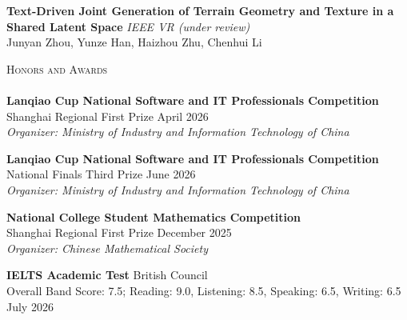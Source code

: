 \documentclass[a4paper, 11pt]{article}
\newcommand{\lineunder} {
    \vspace*{-8pt} \\
    \hspace*{-18pt} \hrulefill \\
}
\newcommand{\header} [1] {
    {\hspace*{-18pt}\vspace*{6pt} \textsc{#1}}
    \vspace*{-6pt} \lineunder
}
\begin{document}
{\textbf{Text-Driven Joint Generation of Terrain Geometry and Texture in a Shared Latent Space}} {\sl IEEE VR (under review)} \\
Junyan Zhou, Yunze Han, Haizhou Zhu, Chenhui Li\\
\vspace*{3mm}

\header{Honors and Awards}
\textbf{Lanqiao Cup National Software and IT Professionals Competition}\\
Shanghai Regional First Prize \hfill April 2026\\
\textit{Organizer: Ministry of Industry and Information Technology of China}\\
\vspace*{3mm}

\textbf{Lanqiao Cup National Software and IT Professionals Competition}\\
National Finals Third Prize \hfill June 2026\\
\textit{Organizer: Ministry of Industry and Information Technology of China}\\
\vspace*{3mm}

\textbf{National College Student Mathematics Competition}\\
Shanghai Regional First Prize \hfill December 2025\\
\textit{Organizer: Chinese Mathematical Society}\\
\vspace*{3mm}

\textbf{IELTS Academic Test} \hfill British Council\\
Overall Band Score: 7.5; Reading: 9.0, Listening: 8.5, Speaking: 6.5, Writing: 6.5 \hfill July 2026\\
\end{document}
